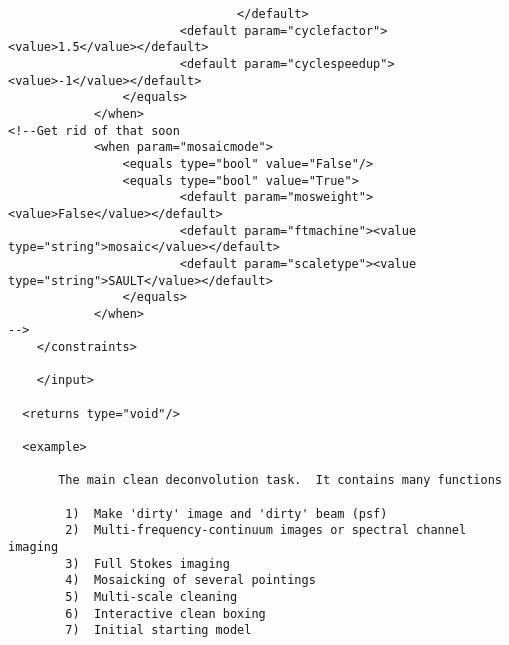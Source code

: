 \begin{verbatim}
                                </default>
                        <default param="cyclefactor"><value>1.5</value></default>
                        <default param="cyclespeedup"><value>-1</value></default>
                </equals>
            </when>
<!--Get rid of that soon
            <when param="mosaicmode">
                <equals type="bool" value="False"/>
                <equals type="bool" value="True">
                        <default param="mosweight"><value>False</value></default>
                        <default param="ftmachine"><value type="string">mosaic</value></default>
                        <default param="scaletype"><value type="string">SAULT</value></default>
                </equals>
            </when>
-->
    </constraints>

    </input>

  <returns type="void"/>

  <example>

       The main clean deconvolution task.  It contains many functions
 
        1)  Make 'dirty' image and 'dirty' beam (psf)
        2)  Multi-frequency-continuum images or spectral channel imaging
        3)  Full Stokes imaging
        4)  Mosaicking of several pointings
        5)  Multi-scale cleaning
        6)  Interactive clean boxing
        7)  Initial starting model
 

\end{verbatim}
